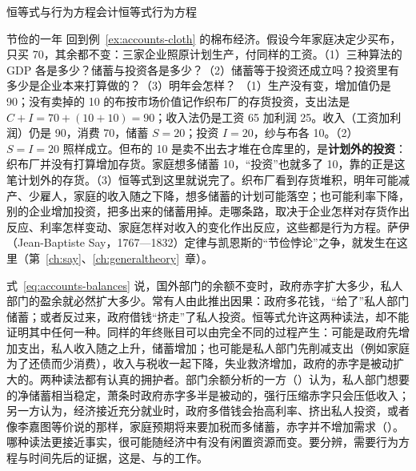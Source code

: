 \begin{compare}{恒等式与行为方程}{会计恒等式}{行为方程}
\end{compare}

\begin{example}{节俭的一年}\label{ex:accounts-thrift}
回到例~\ref{ex:accounts-cloth} 的棉布经济。假设今年家庭决定少买布，只买 70，其余都不变：三家企业照原计划生产，付同样的工资。（1）三种算法的 GDP 各是多少？储蓄与投资各是多少？（2）储蓄等于投资还成立吗？投资里有多少是企业本来打算做的？（3）明年会怎样？
\solution （1）生产没有变，增加值仍是 90；没有卖掉的 10 的布按市场价值记作织布厂的存货投资，支出法是 $C+I=70+(10+10)=90$；收入法仍是工资 65 加利润 25。收入（工资加利润）仍是 90，消费 70，储蓄 $S=20$；投资 $I=20$，纱与布各 10。（2）$S=I=20$ 照样成立。但布的 10 是卖不出去才堆在仓库里的，是\textbf{计划外的投资}：织布厂并没有打算增加存货。家庭想多储蓄 10，“投资”也就多了 10，靠的正是这笔计划外的存货。（3）恒等式到这里就说完了。织布厂看到存货堆积，明年可能减产、少雇人，家庭的收入随之下降，想多储蓄的计划可能落空；也可能利率下降，别的企业增加投资，把多出来的储蓄用掉。走哪条路，取决于企业怎样对存货作出反应、利率怎样变动、家庭怎样对收入的变化作出反应，这些都是行为方程。萨伊（Jean-Baptiste Say，1767—1832）定律与凯恩斯的“节俭悖论”之争，就发生在这里（第~\ref{ch:say}、\ref{ch:generaltheory}~章）。
\end{example}

\begin{pitfall}
式~\eqref{eq:accounts-balances} 说，国外部门的余额不变时，政府赤字扩大多少，私人部门的盈余就必然扩大多少。常有人由此推出因果：政府多花钱，“给了”私人部门储蓄；或者反过来，政府借钱“挤走”了私人投资。恒等式允许这两种读法，却不能证明其中任何一种。同样的年终账目可以由完全不同的过程产生：可能是政府先增加支出，私人收入随之上升，储蓄增加；也可能是私人部门先削减支出（例如家庭为了还债而少消费），收入与税收一起下降，失业救济增加，政府的赤字是被动扩大的。两种读法都有认真的拥护者。部门余额分析的一方（）认为，私人部门想要的净储蓄相当稳定，萧条时政府赤字多半是被动的，强行压缩赤字只会压低收入；另一方认为，经济接近充分就业时，政府多借钱会抬高利率、挤出私人投资，或者像李嘉图等价说的那样，家庭预期将来要加税而多储蓄，赤字并不增加需求（）。哪种读法更接近事实，很可能随经济中有没有闲置资源而变。要分辨，需要行为方程与时间先后的证据，这是、与的工作。
\end{pitfall}

